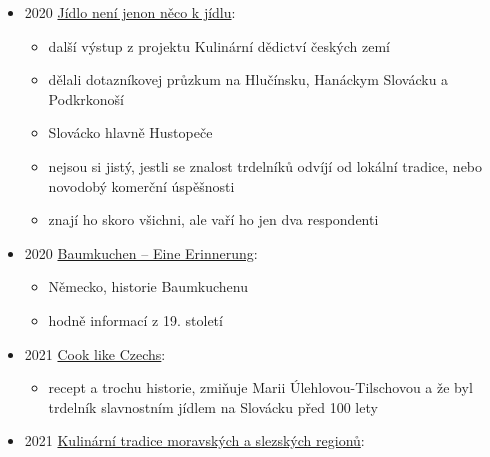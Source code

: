 \begin{itemize}
  \begin{itemize}
  \tightlist
  \item
    není online, 
  \item
    povidly), pěry (kynuté knedlíky šiškovitého tvaru) rovněž plněné
    trnkami (povidly) a sypané mákem, trdelníky - jakési trubičky
  \end{itemize}
\item
  2020
  \href{https://kulturni-dejiny.slu.cz/data/uploads/067/upvysledky/jidlo-neni-jenom_odborna-kniha_uplatnny_2020.pdf}{Jídlo
  není jenon něco k jídlu}:

  \begin{itemize}
  \tightlist
  \item
    další výstup z projektu Kulinární dědictví českých zemí
  \item
    dělali dotazníkovej průzkum na Hlučínsku, Hanáckym Slovácku a
    Podkrkonoší
  \item
    Slovácko hlavně Hustopeče
  \item
    nejsou si jistý, jestli se znalost trdelníků odvíjí od lokální
    tradice, nebo novodobý komerční úspěšnosti
  \item
    znají ho skoro všichni, ale vaří ho jen dva respondenti
  \end{itemize}
\item
  2020
  \href{https://uwe-spiekermann.com/2020/12/01/baumkuchen-eine-erinnerung/}{Baumkuchen
  -- Eine Erinnerung}:

  \begin{itemize}
  \tightlist
  \item
    Německo, historie Baumkuchenu
  \item
    hodně informací z 19. století
  \end{itemize}
\item
  2021 \href{https://www.cooklikeczechs.com/trdelnik/}{Cook like
  Czechs}:

  \begin{itemize}
  \tightlist
  \item
    recept a trochu historie, zmiňuje Marii Úlehlovou-Tilschovou a že
    byl trdelník slavnostním jídlem na Slovácku před 100 lety
  \end{itemize}
\item
  2021
  \href{https://www.nzm.cz/o-nas/veda-a-vyzkum/publikacni-cinnost/odborne-publikace/kulinarni-tradice-moravskych-a-slezskych-regionu}{Kulinární
  tradice moravských a slezských regionů}:


\end{itemize}
